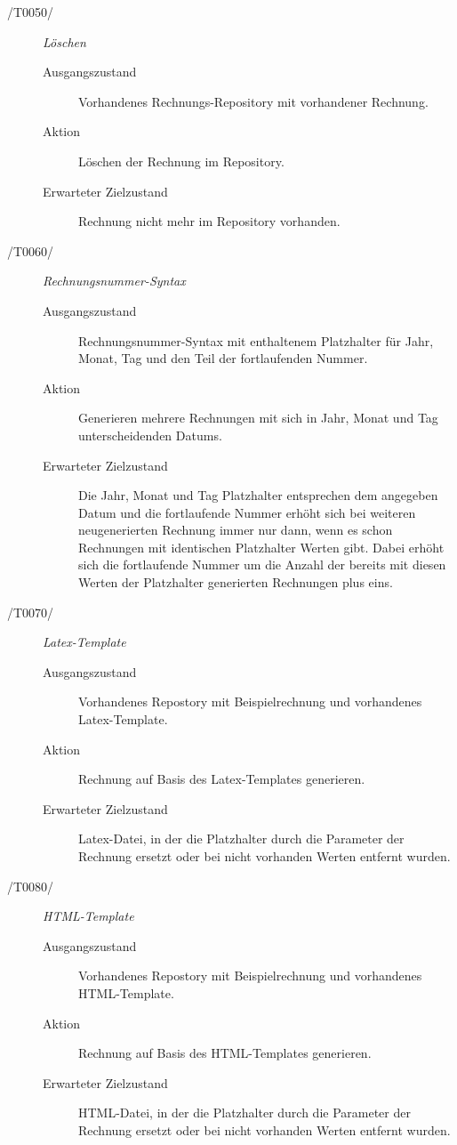 \begin{description}
  \item[/T0050/]
	\textit{Löschen}
	\begin{description}
		\item[Ausgangszustand]
		Vorhandenes Rechnungs-Repository mit vorhandener Rechnung.
		\item[Aktion]
		Löschen der Rechnung im Repository.
		\item[Erwarteter Zielzustand]
		Rechnung nicht mehr im Repository vorhanden.
	\end{description}

  \item[/T0060/]
	\textit{Rechnungsnummer-Syntax}
	\begin{description}
		\item[Ausgangszustand]
		Rechnungsnummer-Syntax mit enthaltenem Platzhalter für Jahr, Monat, Tag und den Teil der fortlaufenden Nummer.
		\item[Aktion]
		Generieren mehrere Rechnungen mit sich in Jahr, Monat und Tag unterscheidenden Datums.
		\item[Erwarteter Zielzustand]
		Die Jahr, Monat und Tag Platzhalter entsprechen dem angegeben Datum und die fortlaufende Nummer erhöht sich bei weiteren neugenerierten Rechnung immer nur dann, wenn es schon Rechnungen mit identischen Platzhalter Werten gibt. Dabei erhöht sich die fortlaufende Nummer um die Anzahl der bereits mit diesen Werten der Platzhalter generierten Rechnungen plus eins.
	\end{description}

  \item[/T0070/]
	\textit{Latex-Template}
	\begin{description}
		\item[Ausgangszustand]
		Vorhandenes Repostory mit Beispielrechnung und vorhandenes Latex-Template.
		\item[Aktion]
		Rechnung auf Basis des Latex-Templates generieren.
		\item[Erwarteter Zielzustand]
		Latex-Datei, in der die Platzhalter durch die Parameter der Rechnung ersetzt oder bei nicht vorhanden Werten entfernt wurden.
	\end{description}

  \item[/T0080/]
	\textit{HTML-Template}
	\begin{description}
		\item[Ausgangszustand]
		Vorhandenes Repostory mit Beispielrechnung und vorhandenes HTML-Template.
		\item[Aktion]
		Rechnung auf Basis des HTML-Templates generieren.
		\item[Erwarteter Zielzustand]
		HTML-Datei, in der die Platzhalter durch die Parameter der Rechnung ersetzt oder bei nicht vorhanden Werten entfernt wurden.
	\end{description}
\end{description}
